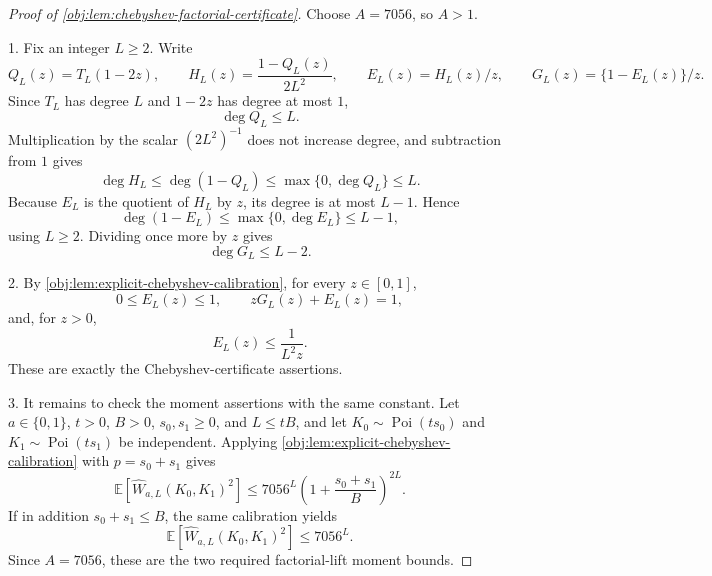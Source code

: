 \begin{proof}[Proof of \cref{obj:lem:chebyshev-factorial-certificate}]
Choose \(A=7056\), so \(A>1\).

1. Fix an integer \(L\ge2\).  Write
\[
Q_L(z)=T_L(1-2z),
\qquad
H_L(z)=\frac{1-Q_L(z)}{2L^2},
\qquad
E_L(z)=H_L(z)/z,
\qquad
G_L(z)=\{1-E_L(z)\}/z .
\]
Since \(T_L\) has degree \(L\) and \(1-2z\) has degree at most \(1\),
\[
\deg Q_L\le L .
\]
Multiplication by the scalar \((2L^2)^{-1}\) does not increase degree, and subtraction from \(1\) gives
\[
\deg H_L
\le \deg(1-Q_L)
\le \max\{0,\deg Q_L\}
\le L .
\]
Because \(E_L\) is the quotient of \(H_L\) by \(z\), its degree is at most \(L-1\).  Hence
\[
\deg(1-E_L)\le \max\{0,\deg E_L\}\le L-1,
\]
using \(L\ge2\).  Dividing once more by \(z\) gives
\[
\deg G_L\le L-2 .
\]

2. By \cref{obj:lem:explicit-chebyshev-calibration}, for every \(z\in[0,1]\),
\[
0\le E_L(z)\le1,
\qquad
zG_L(z)+E_L(z)=1,
\]
and, for \(z>0\),
\[
E_L(z)\le \frac{1}{L^2z}.
\]
These are exactly the Chebyshev-certificate assertions. 

3. It remains to check the moment assertions with the same constant.  Let
\(a\in\{0,1\}\), \(t>0\), \(B>0\), \(s_0,s_1\ge0\), and \(L\le tB\), and let
\(K_0\sim\operatorname{Poi}(ts_0)\) and \(K_1\sim\operatorname{Poi}(ts_1)\) be independent.  Applying \cref{obj:lem:explicit-chebyshev-calibration} with \(p=s_0+s_1\) gives
\[
\mathbb E\!\left[\widehat W_{a,L}(K_0,K_1)^2\right]
\le
7056^L\left(1+\frac{s_0+s_1}{B}\right)^{2L}.
\]
If in addition \(s_0+s_1\le B\), the same calibration yields
\[
\mathbb E\!\left[\widehat W_{a,L}(K_0,K_1)^2\right]
\le
7056^L .
\]
Since \(A=7056\), these are the two required factorial-lift moment bounds. 
\end{proof}
